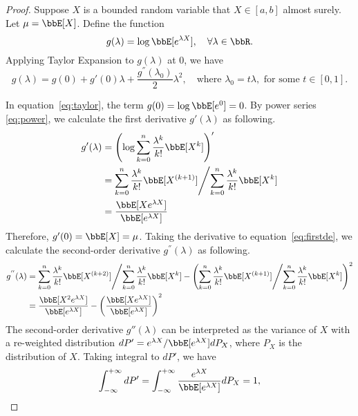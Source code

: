 \documentclass[11pt]{article}
\theoremstyle{plain}
\theoremstyle{definition}
\begin{document}
\begin{proof}
	
Suppose $X$ is a bounded random variable that $X \in [a,b]$ almost surely. Let $\mu = \bbE[X]$. Define the function 
\[ g(\lambda) = \log \bbE[e^{\lambda X }], \quad  \forall \lambda \in \bbR. \]
Applying Taylor Expansion to $g(\lambda)$ at 0, we have
\begin{equation}\label{eq:taylor}
	g(\lambda) =  g(0) + g'(0) \lambda  + \frac{g^{''}(\lambda_0) }{2} \lambda^2, \quad \text{where } \lambda_0 = t \lambda, \text{ for some } t \in [0,1]. 
\end{equation}

In equation~\eqref{eq:taylor}, the term $g(0) =\log \bbE[e^{0}] = 0$. By power series \eqref{eq:power}, we calculate the first derivative $g'(\lambda)$ as following.
\begin{align}
	g'(\lambda ) & = \left( \log \sum_{k = 0}^n \frac{\lambda^k }{k!} \bbE[X^k]  \right)' \\
	&= {\sum_{k = 0}^n \frac{ \lambda^k }{k!} \bbE[X^{(k+1)}] }\Bigg/{\sum_{k = 0}^n \frac{\lambda^k }{k!} \bbE[X^k]}  \label{eq:firstde} \\
	&= \frac{\bbE[X e^{\lambda X} ]}{\bbE[ e^{\lambda X} ]}
\end{align}
Therefore, $g'(0) = \bbE[X] = \mu$. Taking the derivative to equation~\eqref{eq:firstde}, we calculate the second-order derivative $g^{''}(\lambda)$ as following.
\begin{align}
	g^{''}(\lambda)
	&= {\sum_{k = 0}^n \frac{ \lambda^k }{k!} \bbE[X^{(k+2)}] }\Bigg/{\sum_{k = 0}^n \frac{\lambda^k }{k!} \bbE[X^k]} - \left( {\sum_{k = 0}^n \frac{ \lambda^k }{k!} \bbE[X^{(k+1)}] }\Bigg/{\sum_{k = 0}^n \frac{\lambda^k }{k!} \bbE[X^k]}  \right)^2\\
	&= \frac{\bbE[X^2 e^{\lambda X} ]}{\bbE[ e^{\lambda X} ]} - \left( \frac{\bbE[X e^{\lambda X} ]}{\bbE[ e^{\lambda X} ]} \right)^2\\
\end{align}
The second-order derivative $g''(\lambda)$ can be interpreted as the variance of $X$ with a re-weighted distribution $d P' = {e^{\lambda X}}/{\bbE[ e^{\lambda X} ]} d P_X $, where $P_X$ is the distribution of $X$. Taking integral to $dP'$, we have
\begin{equation}
	\int_{-\infty}^{+\infty} d P' = \int_{-\infty}^{+\infty}  \frac{e^{\lambda X}}{\bbE[ e^{\lambda X} ]} d P_X = 1,
\end{equation} 

\end{proof}
\end{document}
